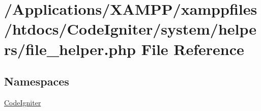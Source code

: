 \hypertarget{file__helper_8php}{}\section{/\+Applications/\+X\+A\+M\+P\+P/xamppfiles/htdocs/\+Code\+Igniter/system/helpers/file\+\_\+helper.php File Reference}
\label{file__helper_8php}
\subsection*{Namespaces}
\begin{DoxyCompactItemize}
\item 
 \mbox{\hyperlink{namespace_code_igniter}{Code\+Igniter}}
\end{DoxyCompactItemize}
